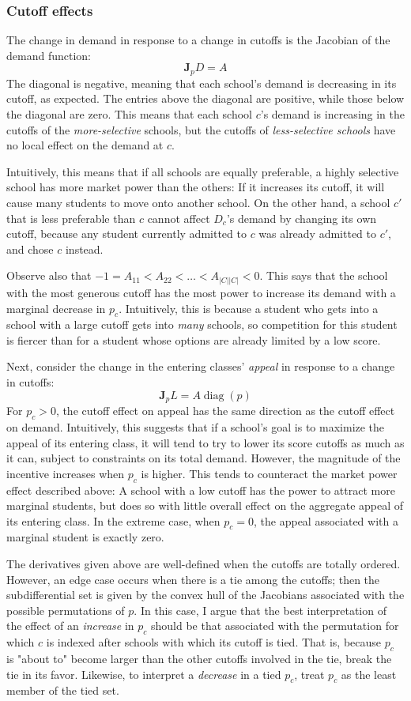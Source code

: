 \documentclass[12pt]{article}
\theoremstyle{definition}
\begin{document}
\subsubsection{Cutoff effects}
The change in demand in response to a change in cutoffs is the Jacobian of the demand function:
\[\mathbf{J}_p D = A \]
The diagonal is negative, meaning that each school's demand is decreasing in its cutoff, as expected. The entries above the diagonal are positive, while those below the diagonal are zero. This means that each school $c$'s demand is increasing in the cutoffs of the \emph{more-selective} schools, but the cutoffs of \emph{less-selective schools} have no local effect on the demand at $c$.

Intuitively, this means that if all schools are equally preferable, a highly selective school has more market power than the others: If it increases its cutoff, it will cause many students to move onto another school. On the other hand, a school $c'$ that is less preferable than $c$ cannot affect $D_c$'s demand by changing its own cutoff, because any student currently admitted to $c$ was already admitted to $c'$, and chose $c$ instead. 

Observe also that $-1 = A_{11} < A_{22} < \dots < A_{|C||C|} < 0$. This says that the school with the most generous cutoff has the most power to increase its demand with a marginal decrease in $p_c$. Intuitively, this is because a student who gets into a school with a large cutoff gets into \emph{many} schools, so competition for this student is fiercer than for a student whose options are already limited by a low score.

Next, consider the change in the entering classes' \emph{appeal} in response to a change in cutoffs:
\[\mathbf{J}_p L = A\operatorname{diag}(p)\]
For $p_c > 0$, the cutoff effect on appeal has the same direction as the cutoff effect on demand. Intuitively, this suggests that if a school's goal is to maximize the appeal of its entering class, it will tend to try to lower its score cutoffs as much as it can, subject to constraints on its total demand. However, the magnitude of the incentive increases when $p_c$ is higher. This tends to counteract the market power effect described above: A school with a low cutoff has the power to attract more marginal students, but does so with little overall effect on the aggregate appeal of its entering class. In the extreme case, when $p_c = 0$, the appeal associated with a marginal student is exactly zero.

The derivatives given above are well-defined when the cutoffs are totally ordered. However, an edge case occurs when there is a tie among the cutoffs; then the subdifferential set is given by the convex hull of the Jacobians associated with the possible permutations of $p$. In this case, I argue that the best interpretation of the effect of an \emph{increase} in $p_c$ should be that associated with the permutation for which $c$ is indexed after schools with which its cutoff is tied. That is, because $p_c$ is "about to" become larger than the other cutoffs involved in the tie, break the tie in its favor. Likewise, to interpret a \emph{decrease} in a tied $p_c$, treat $p_c$ as the least member of the tied set.
\end{document}
